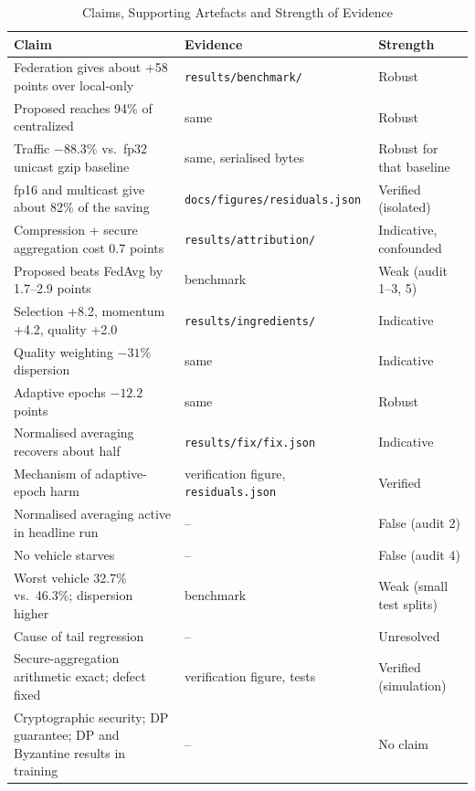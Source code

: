\documentclass[journal]{IEEEtran}
\newcommand{\code}[1]{\texttt{#1}}
\begin{document}
\begin{table}[!t]
\renewcommand{\arraystretch}{1.08}
\caption{Claims, Supporting Artefacts and Strength of Evidence}
\label{tab:claims}
\centering
\footnotesize
\begin{tabular}{@{}L{7.2cm}L{5.6cm}L{3.6cm}@{}}
\toprule
Claim & Evidence & Strength\\
\midrule
Federation gives about +58 points over local-only & \code{results/benchmark/} & Robust\\
Proposed reaches 94\% of centralized & same & Robust\\
Traffic $-88.3\%$ vs.\ fp32 unicast gzip baseline & same, serialised bytes & Robust for that baseline\\
fp16 and multicast give about 82\% of the saving & \code{docs/figures/residuals.json} & Verified (isolated)\\
Compression + secure aggregation cost 0.7 points & \code{results/attribution/} & Indicative, confounded\\
Proposed beats FedAvg by 1.7--2.9 points & benchmark & Weak (audit 1--3, 5)\\
Selection +8.2, momentum +4.2, quality +2.0 & \code{results/ingredients/} & Indicative\\
Quality weighting $-31\%$ dispersion & same & Indicative\\
Adaptive epochs $-12.2$ points & same & Robust\\
Normalised averaging recovers about half & \code{results/fix/fix.json} & Indicative\\
Mechanism of adaptive-epoch harm & verification figure, \code{residuals.json} & Verified\\
Normalised averaging active in headline run & -- & False (audit 2)\\
No vehicle starves & -- & False (audit 4)\\
Worst vehicle 32.7\% vs.\ 46.3\%; dispersion higher & benchmark & Weak (small test splits)\\
Cause of tail regression & -- & Unresolved\\
Secure-aggregation arithmetic exact; defect fixed & verification figure, tests & Verified (simulation)\\
Cryptographic security; DP guarantee; DP and Byzantine results in training & -- & No claim\\
\bottomrule
\end{tabular}
\end{table}
\end{document}
